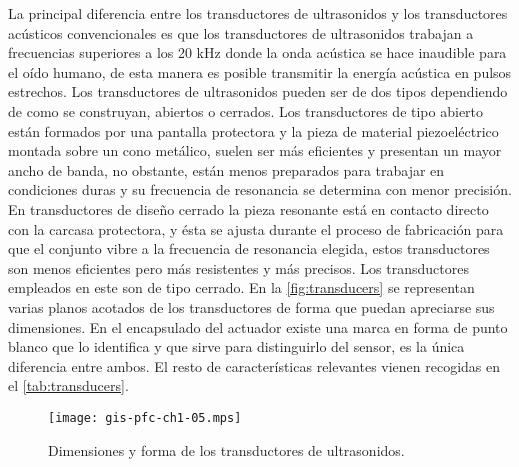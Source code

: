 La principal diferencia entre los transductores de ultrasonidos y los
transductores acústicos convencionales es que los transductores de
ultrasonidos trabajan a frecuencias superiores a los 20 kHz donde la onda
acústica se hace inaudible para el oído humano, de esta manera es posible
transmitir la energía acústica en pulsos estrechos. Los transductores de
ultrasonidos pueden ser de dos tipos dependiendo de como se construyan,
abiertos o cerrados. Los transductores de tipo abierto están formados por
una pantalla protectora y la pieza de material piezoeléctrico montada sobre
un cono metálico, suelen ser más eficientes y presentan un mayor ancho de
banda, no obstante, están menos preparados para trabajar en condiciones
duras y su frecuencia de resonancia se determina con menor precisión. En
transductores de diseño cerrado la pieza resonante está en contacto directo
con la carcasa protectora, y ésta se ajusta durante el proceso de
fabricación para que el conjunto vibre a la frecuencia de resonancia
elegida, estos transductores son menos eficientes pero más resistentes y
más precisos. Los transductores empleados en este  son de tipo
cerrado. En la \vref{fig:transducers} se representan varias planos acotados
de los transductores de forma que puedan apreciarse sus dimensiones. En el
encapsulado del actuador existe una marca en forma de punto blanco que lo
identifica y que sirve para distinguirlo del sensor, es la única diferencia
entre ambos. El resto de características relevantes vienen recogidas en el
\cref{tab:transducers}.



\begin{figure}
	\begin{center}
		\texttt{[image: gis-pfc-ch1-05.mps]}
	\end{center}
	\caption[Dimensiones de los transductores de
	ultrasonidos]{Dimensiones y forma de los transductores de
	ultrasonidos.}
	\label{fig:transducers}
\end{figure}

